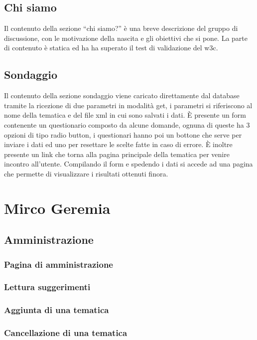 \documentclass[a4paper,10pt]{article}
\begin{document}
\subsection{Chi siamo}

Il contenuto della sezione ``chi siamo?'' \`e una breve descrizione del gruppo di discussione, con le motivazione della nascita e gli obiettivi che si pone. La parte di contenuto \`e statica ed ha ha superato il test di validazione del w3c.

\subsection{Sondaggio}
 
Il contenuto della sezione sondaggio viene caricato direttamente dal database tramite la ricezione di due parametri in modalit\`a get, i parametri si riferiscono al nome della tematica e del file xml in cui sono salvati i dati. \`E presente un form contenente un questionario composto da alcune domande, ognuna di queste ha 3 opzioni di tipo radio button, i questionari hanno poi un bottone che serve per inviare i dati ed uno per resettare le scelte fatte in caso di errore. \`E inoltre presente un link che torna alla pagina principale della tematica per venire incontro all'utente. Compilando il form e spedendo i dati si accede ad una pagina che permette di visualizzare i risultati ottenuti finora.
 
\section{Mirco Geremia}

\subsection{Amministrazione}

\subsubsection{Pagina di amministrazione}
\subsubsection{Lettura suggerimenti}
\subsubsection{Aggiunta di una tematica}
\subsubsection{Cancellazione di una tematica}
\end{document}
